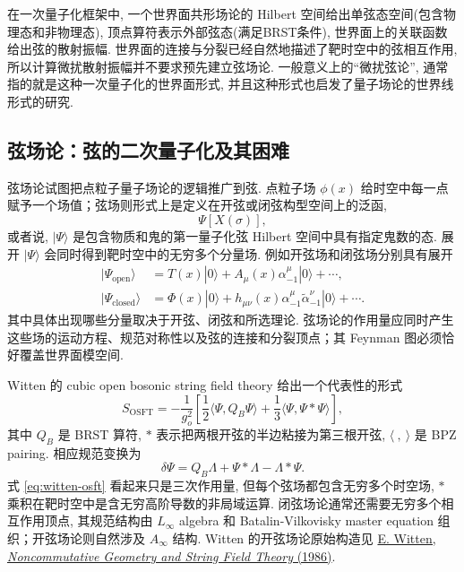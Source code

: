 \documentclass[10pt]{article}
\newcounter{ex}[section]\setcounter{ex}{0}
\numberwithin{equation}{section}
\begin{document}
在一次量子化框架中, 一个世界面共形场论的 Hilbert 空间给出单弦态空间(包含物理态和非物理态), 顶点算符表示外部弦态(满足BRST条件), 世界面上的关联函数给出弦的散射振幅. 世界面的连接与分裂已经自然地描述了靶时空中的弦相互作用, 所以计算微扰散射振幅并不要求预先建立弦场论. 一般意义上的“微扰弦论”, 通常指的就是这种一次量子化的世界面形式, 并且这种形式也启发了量子场论的世界线形式的研究.

\subsection{弦场论：弦的二次量子化及其困难}

弦场论试图把点粒子量子场论的逻辑推广到弦. 点粒子场 $\phi(x)$ 给时空中每一点赋予一个场值；弦场则形式上是定义在开弦或闭弦构型空间上的泛函,
\begin{equation}
\Psi[X(\sigma)],
\end{equation}
或者说, $|\Psi\rangle$ 是包含物质和鬼的第一量子化弦 Hilbert 空间中具有指定鬼数的态. 展开 $|\Psi\rangle$ 会同时得到靶时空中的无穷多个分量场. 例如开弦场和闭弦场分别具有展开
\begin{equation}
\begin{split}
|\Psi_{\mathrm{open}}\rangle
&=T(x)|0\rangle
+A_\mu(x)\alpha_{-1}^\mu|0\rangle+\cdots,\\
|\Psi_{\mathrm{closed}}\rangle
&=\Phi(x)|0\rangle
+h_{\mu\nu}(x)\alpha_{-1}^\mu\widetilde\alpha_{-1}^\nu|0\rangle+\cdots.
\end{split}
\end{equation}
其中具体出现哪些分量取决于开弦、闭弦和所选理论. 弦场论的作用量应同时产生这些场的运动方程、规范对称性以及弦的连接和分裂顶点；其 Feynman 图必须恰好覆盖世界面模空间.

Witten 的 cubic open bosonic string field theory 给出一个代表性的形式
\begin{equation}
S_{\mathrm{OSFT}}
=-\frac{1}{g_o^2}
\left[
\frac12\langle\Psi,Q_B\Psi\rangle
+\frac13\langle\Psi,\Psi*\Psi\rangle
\right],
\label{eq:witten-osft}
\end{equation}
其中 $Q_B$ 是 BRST 算符, $*$ 表示把两根开弦的半边粘接为第三根开弦, $\langle\ ,\ \rangle$ 是 BPZ pairing. 相应规范变换为
\begin{equation}
\delta\Psi
=Q_B\Lambda+\Psi*\Lambda-\Lambda*\Psi.
\end{equation}
式 \eqref{eq:witten-osft} 看起来只是三次作用量, 但每个弦场都包含无穷多个时空场, $*$ 乘积在靶时空中是含无穷高阶导数的非局域运算. 闭弦场论通常还需要无穷多个相互作用顶点, 其规范结构由 $L_\infty$ algebra 和 Batalin-Vilkovisky master equation 组织；开弦场论则自然涉及 $A_\infty$ 结构. Witten 的开弦场论原始构造见 \href{https://doi.org/10.1016/0550-3213(86)90155-0}{E. Witten, \textit{Noncommutative Geometry and String Field Theory} (1986)}.
\end{document}
